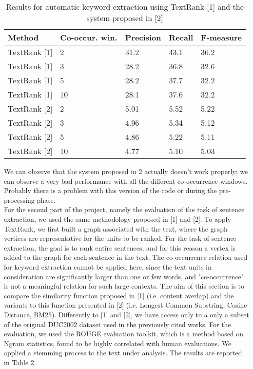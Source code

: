 \documentclass[twoside,twocolumn]{article}
\begin{document}
\begin{table*}[t]
  \centering
  \begin{tabular}{| l  l  l  l  l |}
  \hline
    \textbf{Method} & \textbf{Co-occur. win.} & \textbf{Precision} & \textbf{Recall} & \textbf{F-measure} \\ \hline
    TextRank [1] & 2 & 31.2 & 43.1 & 36.2\\ \hline
    TextRank [1] & 3 & 28.2 & 36.8 & 32.6 \\ \hline
    TextRank [1] & 5 & 28.2 & 37.7 & 32.2\\ \hline
    TextRank [1] & 10 & 28.1 & 37.6 & 32.2 \\ \hline \hline
    TextRank [2] & 2 & 5.01 & 5.52 & 5.22\\ \hline
    TextRank [2] & 3 & 4.96 & 5.34 & 5.12 \\ \hline
    TextRank [2] & 5 & 4.86 & 5.22 & 5.11\\ \hline
    TextRank [2] & 10 & 4.77 & 5.10 & 5.03 \\ \hline \hline
  \end{tabular}
  \caption{Results for automatic keyword extraction using TextRank [1] and the system proposed in [2]}
  \label{tab:1}
\end{table*}

We can observe that the system proposed in 2 actually doesn't work properly; we can observe a very bad performance with all the different co-occurrence windows. Probably there is a problem with this version of the code or during the pre-processing phase. \\
For the second part of the project, namely the evaluation of the task of sentence extraction, we used the same methodology proposed in [1] and [2]. To apply TextRank, we first built a graph associated with the text, where the graph vertices are representative for the units to be ranked. For the task of sentence extraction, the goal is to rank entire sentences, and for this reason a vertex is added to the graph for each sentence in the text. The co-occurrence relation used for keyword extraction cannot be applied here, since the text units in consideration are significantly larger than one or few words, and "co-occurrence" is not a meaningful relation for such large contexts. The aim of this section is to compare the similarity function proposed in [1] (i.e. content overlap) and the variants to this function presented in [2] (i.e. Longest Common Substring, Cosine Distance, BM25). Differently to [1] and [2], we have access only to a only a subset of the original DUC2002 dataset used in the previously cited works. For the evaluation, we used the ROUGE evaluation toolkit, which is a method based on Ngram statistics, found to be highly correlated with human evaluations. We applied a stemming process to the text under analysis. The results are reported in Table 2. 
\end{document}
